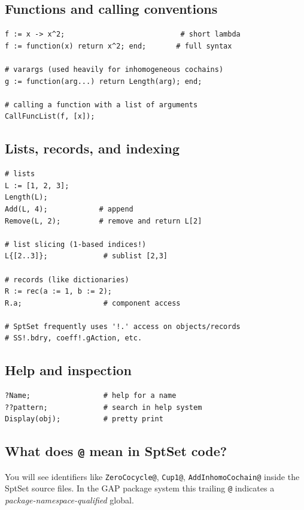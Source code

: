 \documentclass{SciPost}
\begin{document}
\subsection{Functions and calling conventions}

\begin{verbatim}
f := x -> x^2;                           # short lambda
f := function(x) return x^2; end;       # full syntax

# varargs (used heavily for inhomogeneous cochains)
g := function(arg...) return Length(arg); end;

# calling a function with a list of arguments
CallFuncList(f, [x]);
\end{verbatim}

\subsection{Lists, records, and indexing}

\begin{verbatim}
# lists
L := [1, 2, 3];
Length(L);
Add(L, 4);            # append
Remove(L, 2);         # remove and return L[2]

# list slicing (1-based indices!)
L{[2..3]};             # sublist [2,3]

# records (like dictionaries)
R := rec(a := 1, b := 2);
R.a;                   # component access

# SptSet frequently uses '!.' access on objects/records
# SS!.bdry, coeff!.gAction, etc.
\end{verbatim}

\subsection{Help and inspection}

\begin{verbatim}
?Name;                 # help for a name
??pattern;             # search in help system
Display(obj);          # pretty print
\end{verbatim}


\subsection{What does \texttt{@} mean in SptSet code?}
\label{app:gap-at-sptset}

You will see identifiers like \texttt{ZeroCocycle@}, \texttt{Cup1@}, \texttt{AddInhomoCochain@} inside the SptSet source files. In the GAP package system this trailing \texttt{@} indicates a \emph{package-namespace-qualified} global.
\end{document}
